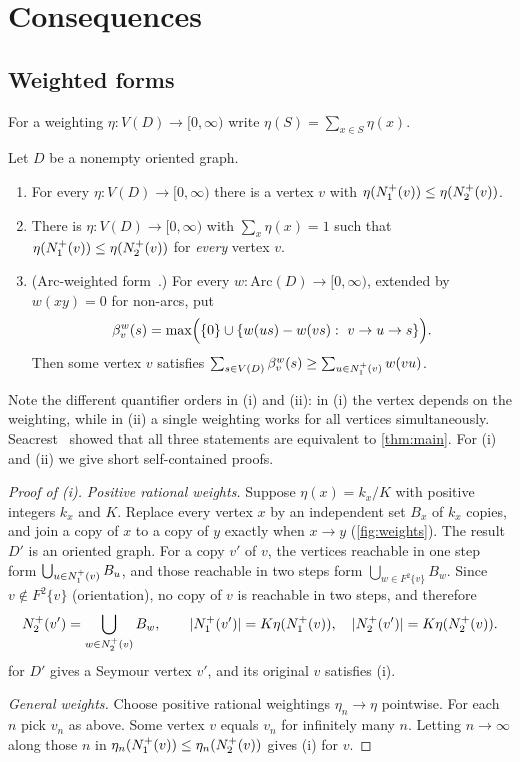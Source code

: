 \section{Consequences}\label{sec:consequences}

\subsection{Weighted forms}\label{sec:weighted}

For a weighting $\eta:V(D)\to[0,\infty)$ write $\eta(S)=\sum_{x\in S}\eta(x)$.

\begin{corollary}\label{cor:weighted}
Let $D$ be a nonempty oriented graph.
\begin{enumerate}[label=\textup{(\roman*)}]
\item For every $\eta:V(D)\to[0,\infty)$ there is a vertex $v$ with
$\eta(N^+_1(v))\le\eta(N^+_2(v))$.
\item There is $\eta:V(D)\to[0,\infty)$ with $\sum_x\eta(x)=1$ such that
$\eta(N^+_1(v))\le\eta(N^+_2(v))$ for \emph{every} vertex $v$.
\item \textup{(Arc-weighted form~\cite{Seacrest2015}.)} For every
$w:\mathrm{Arc}(D)\to[0,\infty)$, extended by $w(xy)=0$ for non-arcs, put
\[
 \beta^w_v(s)=\max\Bigl(\{0\}\cup\{w(us)-w(vs):\ v\to u\to s\}\Bigr).
\]
Then some vertex $v$ satisfies
$\sum_{s\in V(D)}\beta^w_v(s)\ge\sum_{u\in N^+_1(v)}w(vu)$.
\end{enumerate}
\end{corollary}

Note the different quantifier orders in (i) and (ii): in (i) the vertex
depends on the weighting, while in (ii) a single weighting works for all
vertices simultaneously. Seacrest~\cite{Seacrest2015} showed that all three
statements are equivalent to \cref{thm:main}. For (i) and (ii) we give
short self-contained proofs.

\begin{proof}[Proof of \textup{(i)}]
\emph{Positive rational weights.} Suppose $\eta(x)=k_x/K$ with positive
integers $k_x$ and $K$. Replace every vertex $x$ by an independent set
$B_x$ of $k_x$ copies, and join a copy of $x$ to a copy of $y$ exactly when
$x\to y$ (\cref{fig:weights}). The result $D'$ is an oriented graph. For a
copy $v'$ of $v$, the vertices reachable in one step form
$\bigcup_{u\in N^+_1(v)}B_u$, and those reachable in two steps form
$\bigcup_{w\in F^2\{v\}}B_w$. Since $v\notin F^2\{v\}$ (orientation), no copy of
$v$ is reachable in two steps, and therefore
\[
 N^+_2(v')=\bigcup_{w\in N^+_2(v)}B_w,\qquad
 \lvert N^+_1(v')\rvert=K\eta(N^+_1(v)),\quad \lvert N^+_2(v')\rvert=K\eta(N^+_2(v)).
\]
 for $D'$ gives a Seymour vertex $v'$, and its original $v$ satisfies (i).

\emph{General weights.} Choose positive rational weightings $\eta_n\to\eta$
pointwise. For each $n$ pick $v_n$ as above. Some vertex $v$ equals $v_n$ for
infinitely many $n$. Letting $n\to\infty$ along those $n$ in
$\eta_n(N^+_1(v))\le\eta_n(N^+_2(v))$ gives (i) for $v$.
\end{proof}

